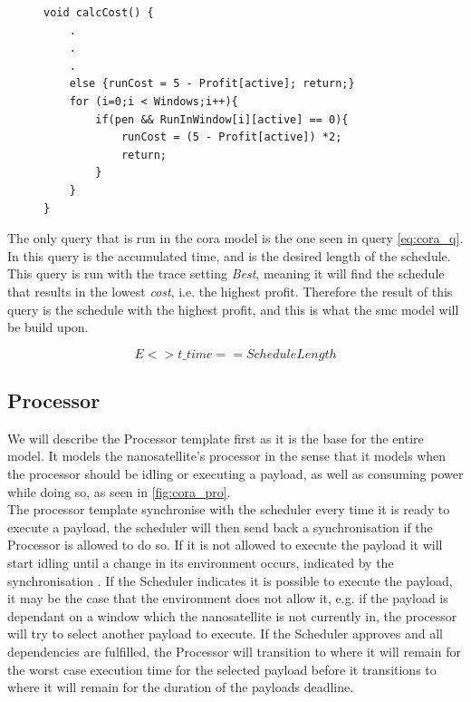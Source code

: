 \begin{figure}[h]
	\begin{lstlisting}[language=my_c, caption={Function calcCost(), used for calculating the cost rate}, label=lst:calcCost]
void calcCost() {
	.
	.
	.
	else {runCost = 5 - Profit[active]; return;}
	for (i=0;i < Windows;i++){ 
		if(pen && RunInWindow[i][active] == 0){
			runCost = (5 - Profit[active]) *2;
			return;
		} 
	}
}	
	\end{lstlisting}
\end{figure}


The only query that is run in the \gls{cora} model is the one seen in query \ref{eq:cora_q}.
In this query  is the accumulated time, and  is the desired length of the schedule.
This query is run with the trace setting \textit{Best}, meaning it will find the schedule that results in the lowest \textit{cost}, i.e. the highest profit.
Therefore the result of this query is the schedule with the highest profit, and this is what the \gls{smc} model will be build upon.

\begin{equation} \label{eq:cora_q}
E<> t\_time == ScheduleLength
\end{equation}

\subsection*{Processor} \label{ssec:cora_pro}
We will describe the Processor template first as it is the base for the entire model.
It models the nanosatellite's processor in the sense that it models when the processor should be idling or executing a payload, as well as consuming power while doing so, as seen in \cref{fig:cora_pro}.\\
The processor template synchronise with the scheduler every time it is ready to execute a payload, the scheduler will then send back a synchronisation if the Processor is allowed to do so.
If it is not allowed to execute the payload it will start idling until a change in its environment occurs, indicated by the synchronisation .
If the Scheduler indicates it is possible to execute the payload, it may be the case that the environment does not allow it, e.g. if the payload is dependant on a window which the nanosatellite is not currently in, the processor will try to select another payload to execute.
If the Scheduler approves and all dependencies are fulfilled, the Processor will transition to  where it will remain for the worst case execution time for the selected payload before it transitions to  where it will remain for the duration of the payloads deadline.

